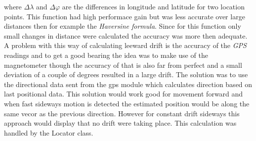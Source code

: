 where $\Delta\lambda$ and $\Delta\varphi$ are the differences in longitude and latitude for two location points. This function had high performace gain but was less accurate over large distances then for example the \textit{Haversine formula}\cite{haversine}. Since for this function only small changes in distance were calculated the accuracy was more then adequate. A problem with this way of calculating leeward drift is the accuracy of the \textit{GPS} readings and to get a good bearing the idea was to make use of the magnetometer though the accuracy of that is also far from perfect and a small deviation of a couple of degrees resulted in a large drift. The solution was to use the directional data sent from the gps module which calculates direction based on last positional data. This solution would work good for movement forward and when fast sideways motion is detected the estimated position would be along the same vecor as the previous direction. However for constant drift sideways this approach would display that no drift were taking place. This calculation was handled by the Locator class.


























